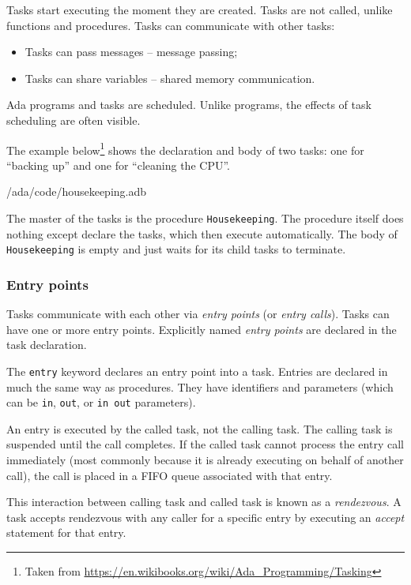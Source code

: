Tasks start executing the moment they are created. Tasks are not called, unlike functions and procedures. Tasks can communicate with other tasks:

  \begin{itemize}

  \item Tasks can pass messages -- message passing;

  \item Tasks can share variables -- shared memory communication.

  \end{itemize}

Ada programs and tasks are scheduled. Unlike programs, the effects of task scheduling are often visible. 

The example below\footnote{Taken from \url{https://en.wikibooks.org/wiki/Ada_Programming/Tasking}} shows the declaration and body of two tasks: one for ``backing up'' and one for ``cleaning the CPU''.

 {\rootdir/ada/code/housekeeping.adb}

The master of the tasks is the procedure \texttt{Housekeeping}. The procedure itself does nothing except declare the tasks, which then execute automatically. The body of \texttt{Housekeeping} is empty and just waits for its child tasks to terminate.


\subsubsection*{Entry points}

Tasks communicate with each other via \emph{entry points} (or \emph{entry calls}). Tasks can have one or more entry points. Explicitly named \emph{entry points} are declared in the task declaration.


The \texttt{entry} keyword declares an entry point into a task.  Entries are declared in much the same way as procedures. They have identifiers and parameters (which can be \texttt{in}, \texttt{out}, or \texttt{in out} parameters).

An entry is executed by the called task, not the calling task. The calling task is suspended until the call completes. If the called task cannot process the entry call immediately (most commonly because it is already executing on behalf of another call), the call is placed in a FIFO queue associated with that entry.


This interaction between calling task and called task is known as a
\emph{rendezvous}. A task accepts rendezvous with any caller for a specific entry by executing an \emph{accept} statement for that entry.

